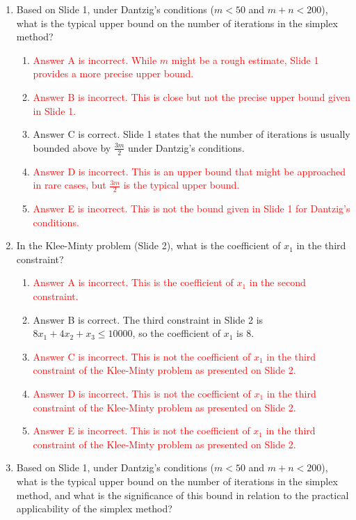 \documentclass{article}%
\newcommand{\incorrect}[1]{\textcolor{red}{#1}}
\begin{document}
\begin{enumerate}
\begin{enumerate}
\end{enumerate}%
\vspace{1em}%
\item Based on Slide 1, under Dantzig's conditions ($m < 50$ and $m + n < 200$), what is the typical upper bound on the number of iterations in the simplex method?%
\begin{enumerate}%
\item \incorrect{Answer A is incorrect. While $m$ might be a rough estimate, Slide 1 provides a more precise upper bound.}%
\item \incorrect{Answer B is incorrect. This is close but not the precise upper bound given in Slide 1.}%
\item Answer C is correct. Slide 1 states that the number of iterations is usually bounded above by $\frac{3m}{2}$ under Dantzig's conditions.%
\item \incorrect{Answer D is incorrect. This is an upper bound that might be approached in rare cases, but $\frac{3m}{2}$ is the typical upper bound.}%
\item \incorrect{Answer E is incorrect. This is not the bound given in Slide 1 for Dantzig's conditions.}%
\end{enumerate}%
\vspace{1em}%
\item In the Klee-Minty problem (Slide 2), what is the coefficient of $x_1$ in the third constraint?%
\begin{enumerate}%
\item \incorrect{Answer A is incorrect. This is the coefficient of $x_1$ in the second constraint.}%
\item Answer B is correct. The third constraint in Slide 2 is $8x_1 + 4x_2 + x_3 \le 10000$, so the coefficient of $x_1$ is 8.%
\item \incorrect{Answer C is incorrect. This is not the coefficient of $x_1$ in the third constraint of the Klee-Minty problem as presented on Slide 2.}%
\item \incorrect{Answer D is incorrect. This is not the coefficient of $x_1$ in the third constraint of the Klee-Minty problem as presented on Slide 2.}%
\item \incorrect{Answer E is incorrect. This is not the coefficient of $x_1$ in the third constraint of the Klee-Minty problem as presented on Slide 2.}%
\end{enumerate}%
\vspace{1em}%
\item Based on Slide 1, under Dantzig's conditions ($m < 50$ and $m + n < 200$), what is the typical upper bound on the number of iterations in the simplex method, and what is the significance of this bound in relation to the practical applicability of the simplex method?%

\end{enumerate}
\end{document}
